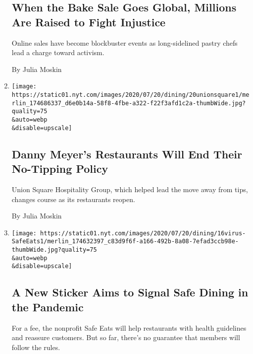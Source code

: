 \begin{enumerate}
  \hypertarget{when-the-bake-sale-goes-global-millions-are-raised-to-fight-injustice}{%
  \subsection{When the Bake Sale Goes Global, Millions Are Raised to
  Fight
  Injustice}\label{when-the-bake-sale-goes-global-millions-are-raised-to-fight-injustice}}

  Online sales have become blockbuster events as long-sidelined pastry
  chefs lead a charge toward activism.

  By Julia Moskin
\item
  \href{/2020/07/20/dining/danny-meyer-no-tips.html}{}

  \texttt{[image: https://static01.nyt.com/images/2020/07/20/dining/20unionsquare1/merlin\_174686337\_d6e0b14a-58f8-4fbe-a322-f22f3afd1c2a-thumbWide.jpg?quality=75\\\&auto=webp\\\&disable=upscale]}

  \hypertarget{danny-meyers-restaurants-will-end-their-no-tipping-policy}{%
  \subsection{Danny Meyer's Restaurants Will End Their No-Tipping
  Policy}\label{danny-meyers-restaurants-will-end-their-no-tipping-policy}}

  Union Square Hospitality Group, which helped lead the move away from
  tips, changes course as its restaurants reopen.

  By Julia Moskin
\item
  \href{/2020/07/17/dining/safe-eats-sticker-restaurants-coronavirus.html}{}

  \texttt{[image: https://static01.nyt.com/images/2020/07/20/dining/16virus-SafeEats1/merlin\_174632397\_c83d9f6f-a166-492b-8a08-7efad3ccb98e-thumbWide.jpg?quality=75\\\&auto=webp\\\&disable=upscale]}

  \hypertarget{a-new-sticker-aims-to-signal-safe-dining-in-the-pandemic}{%
  \subsection{A New Sticker Aims to Signal Safe Dining in the
  Pandemic}\label{a-new-sticker-aims-to-signal-safe-dining-in-the-pandemic}}

  For a fee, the nonprofit Safe Eats will help restaurants with health
  guidelines and reassure customers. But so far, there's no guarantee
  that members will follow the rules.


\end{enumerate}
